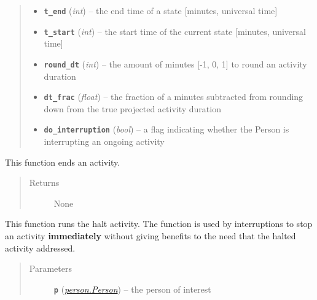 \documentclass[letterpaper,10pt,english]{sphinxmanual}
\begin{document}
\begin{fulllineitems}
\begin{quote}
\begin{description}
\begin{itemize}
\item {} 
\textbf{\texttt{t\_end}} (\emph{int}) -- the end time of a state {[}minutes, universal time{]}

\item {} 
\textbf{\texttt{t\_start}} (\emph{int}) -- the start time of the current state {[}minutes, universal time{]}

\item {} 
\textbf{\texttt{round\_dt}} (\emph{int}) -- the amount of minutes {[}-1, 0, 1{]} to round an activity duration

\item {} 
\textbf{\texttt{dt\_frac}} (\emph{float}) -- the fraction of a minutes subtracted from rounding down from the true projected     activity duration

\item {} 
\textbf{\texttt{do\_interruption}} (\emph{bool}) -- a flag indicating whether the Person is interrupting an ongoing activity

\end{itemize}

\end{description}\end{quote}

\begin{fulllineitems}
\label{state:state.State.end_activity}
This function ends an activity.
\begin{quote}\begin{description}
\item[{Returns}] \leavevmode
None

\end{description}\end{quote}

\end{fulllineitems}


\begin{fulllineitems}
\label{state:state.State.halt_activity}
This function runs the halt activity. The function is used by interruptions         to stop an activity \textbf{immediately} without giving benefits to the need that the         halted activity addressed.
\begin{quote}\begin{description}
\item[{Parameters}] \leavevmode
\textbf{\texttt{p}} ({\hyperref[person:person.Person]{\emph{\emph{person.Person}}}}) -- the person of interest


\end{description}
\end{quote}
\end{fulllineitems}
\end{fulllineitems}
\end{document}
